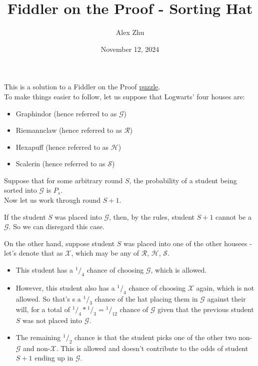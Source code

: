 \documentclass[10pt, letterpaper]{article}
\title{Fiddler on the Proof - Sorting Hat}
\author{Alex Zhu}
\date{November 12, 2024}
\newcommand*\rfrac[2]{{}^{#1}\!/_{#2}}
\begin{document}
\maketitle

This is a solution to a Fiddler on the Proof \href{https://thefiddler.substack.com/p/where-will-the-sorting-hat-put-you}{puzzle}. \\

To make things easier to follow, let us suppose that Logwarts' four houses are:
\begin{itemize}
    \item Graphindor (hence referred to as $\mathcal{G}$)
    \item Riemannclaw (hence referred to as $\mathcal{R}$)
    \item Hexapuff (hence referred to as $\mathcal{H}$)
    \item Scalerin (hence referred to as $\mathcal{S}$)
\end{itemize}

Suppose that for some arbitrary round $S$, the probability of a student being sorted into $\mathcal{G}$ is $P_s$.\\

Now let us work through round $S+1$.

If the student $S$ was placed into $\mathcal{G}$, then, by the rules, student $S+1$ cannot be a $\mathcal{G}$. So we can disregard this case.

On the other hand, suppose student $S$ was placed into one of the other housees - let's denote that as $\mathcal{X}$, which may be any of $\mathcal{R}$, $\mathcal{H}$, $\mathcal{S}$.
\begin{itemize}

\item
    This student has a $\rfrac{1}{4}$ chance of choosing $\mathcal{G}$, which is allowed.
\item
    However, this student also has a $\rfrac{1}{4}$ chance of choosing $\mathcal{X}$ again, which is not allowed.
    So that's s a $\rfrac{1}{3}$ chance of the hat placing them in $\mathcal{G}$ against their will, for a total of $\rfrac{1}{4}*\rfrac{1}{3}=\rfrac{1}{12}$ chance of $\mathcal{G}$ given that the previous student $S$ was not placed into $\mathcal{G}$.
\item
    The remaining $\rfrac{1}{2}$ chance is that the student picks one of the other two non-$\mathcal{G}$ and non-$\mathcal{X}$. This is allowed and doesn't contribute to the odds of student $S+1$ ending up in $\mathcal{G}$.
\end{itemize}
\end{document}
